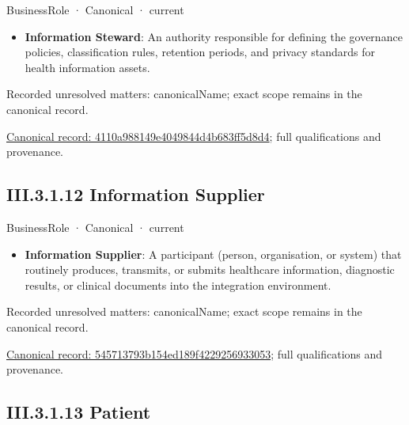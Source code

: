 \label{element:4110a988149e4049844d4b683ff5d8d4}
{\small BusinessRole · Canonical · current}\par

\begin{itemize}


\item \textbf{Information Steward}: An authority responsible for defining the governance policies, classification rules, retention periods, and privacy standards for health information assets.

\end{itemize}

{\small Recorded unresolved matters: canonicalName; exact scope remains in the canonical record.}\par
{\footnotesize \href{../../../../../../../continuum/business/business-role/4110a988149e4049844d4b683ff5d8d4.md}{Canonical record: 4110a988149e4049844d4b683ff5d8d4}; full qualifications and provenance.}\par
\subsection*{III.3.1.12 Information Supplier}
\label{navigation:III.3.1.12}

\label{element:545713793b154ed189f4229256933053}
{\small BusinessRole · Canonical · current}\par

\begin{itemize}


\item \textbf{Information Supplier}: A participant (person, organisation, or system) that routinely produces, transmits, or submits healthcare information, diagnostic results, or clinical documents into the integration environment.

\end{itemize}

{\small Recorded unresolved matters: canonicalName; exact scope remains in the canonical record.}\par
{\footnotesize \href{../../../../../../../continuum/business/business-role/545713793b154ed189f4229256933053.md}{Canonical record: 545713793b154ed189f4229256933053}; full qualifications and provenance.}\par
\subsection*{III.3.1.13 Patient}
\label{navigation:III.3.1.13}

